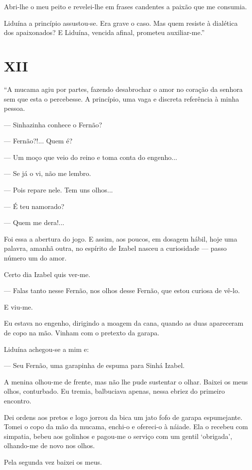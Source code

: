 Abri-lhe o meu peito e revelei-lhe em frases candentes a paixão que me
consumia.

Liduína a princípio assustou-se. Era grave o caso. Mas quem resiste à
dialética dos apaixonados? E Liduína, vencida afinal, prometeu
auxiliar-me.''

\section{XII}

``A mucama agiu por partes, fazendo desabrochar o amor no coração da
senhora sem que esta o percebesse. A princípio, uma vaga e discreta
referência à minha pessoa.

--- Sinhazinha conhece o Fernão?

--- Fernão?!... Quem é?

--- Um moço que veio do reino e toma conta do engenho...

--- Se já o vi, não me lembro.

--- Pois repare nele. Tem uns olhos...

--- É teu namorado?

--- Quem me dera!...

Foi essa a abertura do jogo. E assim, aos poucos, em dosagem hábil, hoje
uma palavra, amanhã outra, no espírito de Izabel nasceu a curiosidade
--- passo número um do amor.

Certo dia Izabel quis ver-me.

--- Falas tanto nesse Fernão, nos olhos desse Fernão, que estou curiosa
de vê-lo.

E viu-me.

Eu estava no engenho, dirigindo a moagem da cana, quando as duas
apareceram de copo na mão. Vinham com o pretexto da garapa.

Liduína achegou-se a mim e:

--- Seu Fernão, uma garapinha de espuma para Sinhá Izabel.

A menina olhou-me de frente, mas não lhe pude sustentar o olhar. Baixei
os meus olhos, conturbado. Eu tremia, balbuciava apenas, nessa ebriez do
primeiro encontro.

Dei ordens aos pretos e logo jorrou da bica um jato fofo de garapa
espumejante. Tomei o copo da mão da mucama, enchi-o e ofereci-o à
náiade. Ela o recebeu com simpatia, bebeu aos golinhos e pagou-me o
serviço com um gentil `obrigada', olhando-me de novo nos olhos.

Pela segunda vez baixei os meus.

